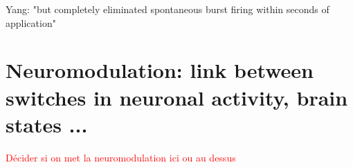 Yang: "but completely eliminated spontaneous burst firing within seconds of application"

\newpage
\section{Neuromodulation: link between switches in neuronal activity, brain states ...}
\textcolor{red}{Décider si on met la neuromodulation ici ou au dessus}


